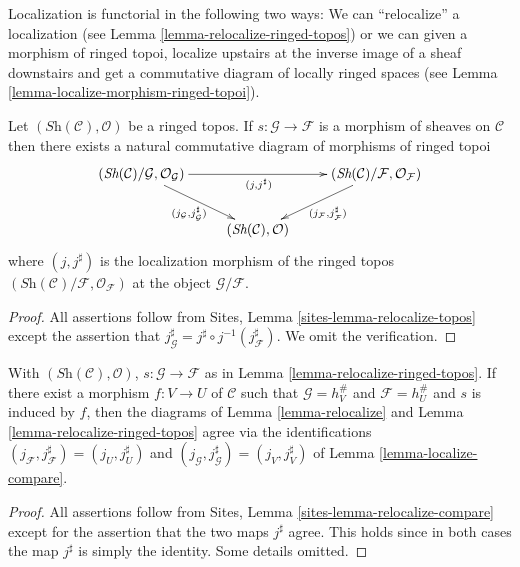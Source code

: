 \noindent
Localization is functorial in the following two ways:
We can ``relocalize'' a localization (see
Lemma \ref{lemma-relocalize-ringed-topos})
or we can given a morphism of ringed topoi, localize upstairs at
the inverse image of a sheaf downstairs and get a commutative
diagram of locally ringed spaces (see
Lemma \ref{lemma-localize-morphism-ringed-topoi}).

\begin{lemma}
\label{lemma-relocalize-ringed-topos}
Let $(\textit{Sh}(\mathcal{C}), \mathcal{O})$ be a ringed topos.
If $s : \mathcal{G} \to \mathcal{F}$ is a morphism of sheaves
on $\mathcal{C}$ then there exists a natural commutative diagram of
morphisms of ringed topoi
$$
\xymatrix{
(\textit{Sh}(\mathcal{C})/\mathcal{G}, \mathcal{O}_{\mathcal{G}})
\ar[rd]_{(j_\mathcal{G}, j_{\mathcal{G}}^\sharp)} \ar[rr]_{(j, j^\sharp)} & &
(\textit{Sh}(\mathcal{C})/\mathcal{F}, \mathcal{O}_{\mathcal{F}})
\ar[ld]^{(j_\mathcal{F}, j_{\mathcal{F}}^\sharp)} \\
& (\textit{Sh}(\mathcal{C}), \mathcal{O}) &
}
$$
where $(j, j^\sharp)$ is the localization morphism of the ringed topos
$(\textit{Sh}(\mathcal{C})/\mathcal{F}, \mathcal{O}_{\mathcal{F}})$
at the object $\mathcal{G}/\mathcal{F}$.
\end{lemma}

\begin{proof}
All assertions follow from
Sites, Lemma \ref{sites-lemma-relocalize-topos}
except the assertion that
$j_{\mathcal{G}}^\sharp = j^\sharp \circ j^{-1}(j_{\mathcal{F}}^\sharp)$.
We omit the verification.
\end{proof}

\begin{lemma}
\label{lemma-relocalize-compare}
With $(\textit{Sh}(\mathcal{C}), \mathcal{O})$,
$s : \mathcal{G} \to \mathcal{F}$ as in
Lemma \ref{lemma-relocalize-ringed-topos}.
If there exist a morphism $f : V \to U$ of $\mathcal{C}$
such that $\mathcal{G} = h_V^\#$ and $\mathcal{F} = h_U^\#$
and $s$ is induced by $f$, then the
diagrams of
Lemma \ref{lemma-relocalize}
and
Lemma \ref{lemma-relocalize-ringed-topos}
agree via the identifications
$(j_{\mathcal{F}}, j_{\mathcal{F}}^\sharp) = (j_U, j_U^\sharp)$
and
$(j_{\mathcal{G}}, j_{\mathcal{G}}^\sharp) = (j_V, j_V^\sharp)$
of
Lemma \ref{lemma-localize-compare}.
\end{lemma}

\begin{proof}
All assertions follow from
Sites, Lemma \ref{sites-lemma-relocalize-compare}
except for the assertion that the two maps $j^\sharp$
agree. This holds since in both cases the map
$j^\sharp$ is simply the identity. Some details omitted.
\end{proof}










